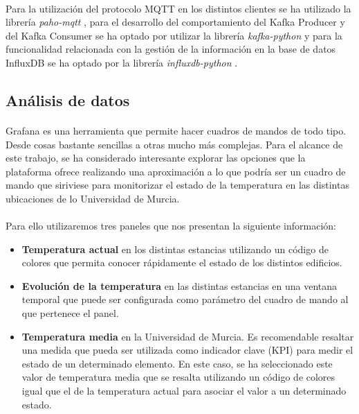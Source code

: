 \documentclass[12pt, a4paper]{article}
\begin{document}
        \paragraph{}
        Para la utilización del protocolo MQTT en los distintos clientes se ha utilizado la librería \textit{paho-mqtt} \cite{paho-mqtt}, para el desarrollo del comportamiento del Kafka Producer y del Kafka Consumer se ha optado por utilizar la librería \textit{kafka-python} \cite{kafka-python} y para la funcionalidad relacionada con la gestión de la información en la base de datos InfluxDB se ha optado por la librería \textit{influxdb-python} \cite{influx-python}.
        
        \subsection{Análisis de datos} \label{sec-data-analysis}
        
        \paragraph{}
        Grafana es una herramienta que permite hacer cuadros de mandos de todo tipo. Desde cosas bastante sencillas a otras mucho más complejas. Para el alcance de este trabajo, se ha considerado interesante explorar las opciones que la plataforma ofrece realizando una aproximación a lo que podría ser un cuadro de mando que siriviese para monitorizar el estado de la temperatura en las distintas ubicaciones de lo Universidad de Murcia.

        \paragraph{}
        Para ello utilizaremos tres paneles que nos presentan la siguiente información:
        
        \begin{itemize}
            \item \textbf{Temperatura actual} en los distintas estancias utilizando un código de colores que permita conocer rápidamente el estado de los distintos edificios.
            \item \textbf{Evolución de la temperatura} en las distintas estancias en una ventana temporal que puede ser configurada como parámetro del cuadro de mando al que pertenece el panel.
            \item \textbf{Temperatura media} en la Universidad de Murcia. Es recomendable resaltar una medida que pueda ser utilizada como indicador clave (KPI) para medir el estado de un determinado elemento. En este caso, se ha seleccionado este valor de temperatura media que se resalta utilizando un código de colores igual que el de la temperatura actual para asociar el valor a un determinado estado.
        \end{itemize}
\end{document}
